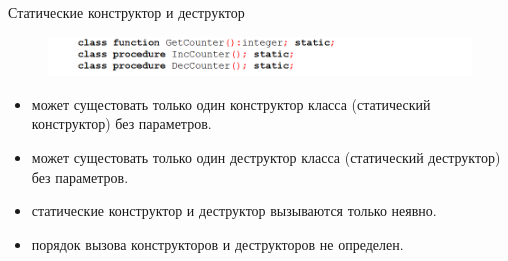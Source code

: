 \documentclass{beamer}
\begin{document}
\begin{frame}{Статические конструктор и деструктор}
\begin{figure}[h]
\centering
\includegraphics[scale=0.5]{images/lec05-pic15.png}
\end{figure}
\begin{itemize}
\item может сущестовать только один конструктор класса (статический конструктор) без параметров.
\item может сущестовать только один деструктор класса (статический деструктор) без параметров.
\item статические конструктор и деструктор вызываются только неявно.
\item порядок вызова конструкторов и деструкторов не определен.
\end{itemize}
\end{frame}

\end{document}
